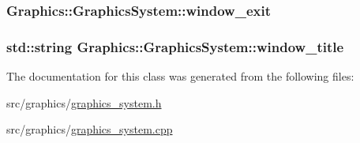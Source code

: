 \subsubsection[{window\+\_\+exit}]{ Graphics\+::\+Graphics\+System\+::window\+\_\+exit\hspace{0.3cm}{\ttfamily [private]}}\label{class_graphics_1_1_graphics_system_ac31d552052e7afd10043456ee9393e1a}
\hypertarget{class_graphics_1_1_graphics_system_a7b543ac0f4323ec286519a3dfef0df1c}{}
\subsubsection[{window\+\_\+title}]{\setlength{\rightskip}{0pt plus 5cm}std\+::string Graphics\+::\+Graphics\+System\+::window\+\_\+title\hspace{0.3cm}{\ttfamily [private]}}\label{class_graphics_1_1_graphics_system_a7b543ac0f4323ec286519a3dfef0df1c}


The documentation for this class was generated from the following files\+:\begin{DoxyCompactItemize}
\item 
src/graphics/\hyperlink{graphics__system_8h}{graphics\+\_\+system.\+h}\item 
src/graphics/\hyperlink{graphics__system_8cpp}{graphics\+\_\+system.\+cpp}\end{DoxyCompactItemize}
